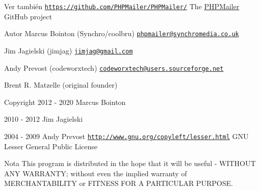 \begin{DoxySeeAlso}{Ver también}
\href{https://github.com/PHPMailer/PHPMailer/}{\tt https\+://github.\+com/\+P\+H\+P\+Mailer/\+P\+H\+P\+Mailer/} The \hyperlink{classPHPMailer_1_1PHPMailer_1_1PHPMailer}{P\+H\+P\+Mailer} Git\+Hub project
\end{DoxySeeAlso}
\begin{DoxyAuthor}{Autor}
Marcus Bointon (Synchro/coolbru) \href{mailto:phpmailer@synchromedia.co.uk}{\tt phpmailer@synchromedia.\+co.\+uk} 

Jim Jagielski (jimjag) \href{mailto:jimjag@gmail.com}{\tt jimjag@gmail.\+com} 

Andy Prevost (codeworxtech) \href{mailto:codeworxtech@users.sourceforge.net}{\tt codeworxtech@users.\+sourceforge.\+net} 

Brent R. Matzelle (original founder) 
\end{DoxyAuthor}
\begin{DoxyCopyright}{Copyright}
2012 -\/ 2020 Marcus Bointon 

2010 -\/ 2012 Jim Jagielski 

2004 -\/ 2009 Andy Prevost  \href{http://www.gnu.org/copyleft/lesser.html}{\tt http\+://www.\+gnu.\+org/copyleft/lesser.\+html} G\+NU Lesser General Public License 
\end{DoxyCopyright}
\begin{DoxyNote}{Nota}
This program is distributed in the hope that it will be useful -\/ W\+I\+T\+H\+O\+UT A\+NY W\+A\+R\+R\+A\+N\+TY; without even the implied warranty of M\+E\+R\+C\+H\+A\+N\+T\+A\+B\+I\+L\+I\+TY or F\+I\+T\+N\+E\+SS F\+OR A P\+A\+R\+T\+I\+C\+U\+L\+AR P\+U\+R\+P\+O\+SE. 
\end{DoxyNote}
